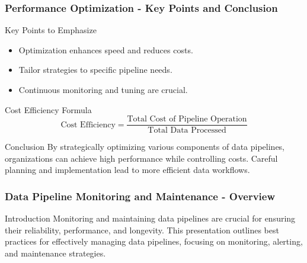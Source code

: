 \documentclass[aspectratio=169]{beamer}
\begin{document}
\begin{frame}[fragile]
    \frametitle{Performance Optimization - Key Points and Conclusion}
    \begin{block}{Key Points to Emphasize}
        \begin{itemize}
            \item Optimization enhances speed and reduces costs.
            \item Tailor strategies to specific pipeline needs.
            \item Continuous monitoring and tuning are crucial.
        \end{itemize}
    \end{block}

    \begin{block}{Cost Efficiency Formula}
        \begin{equation}
        \text{Cost Efficiency} = \frac{\text{Total Cost of Pipeline Operation}}{\text{Total Data Processed}}
        \end{equation}
    \end{block}

    \begin{block}{Conclusion}
        By strategically optimizing various components of data pipelines, organizations can achieve high performance while controlling costs.
        Careful planning and implementation lead to more efficient data workflows.
    \end{block}
\end{frame}

\begin{frame}[fragile]
    \frametitle{Data Pipeline Monitoring and Maintenance - Overview}
    \begin{block}{Introduction}
        Monitoring and maintaining data pipelines are crucial for ensuring their reliability, performance, and longevity. This presentation outlines best practices for effectively managing data pipelines, focusing on monitoring, alerting, and maintenance strategies.
    \end{block}
\end{frame}
\end{document}
